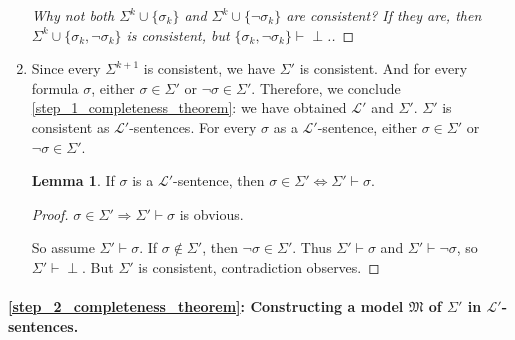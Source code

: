 \documentclass[11pt,letterpaper]{book}
\theoremstyle{definition}
\newtheorem{lemma}{Lemma}[section]
\begin{document}
\begin{enumerate}
\begin{proof}
[Why not both $\Sigma^k \cup \{ \sigma_k \}$ and $\Sigma^k \cup \{ \lnot
\sigma_k \} $ are consistent? If they are, then $\Sigma^k \cup \{
\sigma_k, \lnot \sigma_k \}$ is consistent, but $\{ \sigma_k, \lnot
\sigma_k \} \vdash \perp $.]
\end{proof}

\item{Since every $\Sigma^{k+1}$ is consistent, we have $\Sigma'$ is
consistent. And for every formula $\sigma$, either $\sigma \in \Sigma'$
or $\lnot \sigma  \in \Sigma' $. Therefore, we conclude
\ref{step_1_completeness_theorem}: we have obtained $\mathcal{L}'$ and
$\Sigma'$. $\Sigma'$ is consistent as $\mathcal{L}'$-sentences. For
every  $\sigma$ as a $\mathcal{L}'$-sentence, either $\sigma \in
\Sigma'$ or $ \lnot \sigma \in \Sigma'$.}

\begin{lemma}\label{lemma:sentence_in_Sigma_prime_deducible}
If $\sigma$ is a $\mathcal{L}'$-sentence, then $\sigma \in \Sigma' \iff
\Sigma' \vdash \sigma$.

\end{lemma}

\begin{proof}
$\sigma \in \Sigma' \Rightarrow \Sigma' \vdash \sigma$ is obvious.

So assume $\Sigma' \vdash \sigma$. If $\sigma \not \in \Sigma'$, then
$\lnot \sigma \in \Sigma'$. Thus $\Sigma' \vdash \sigma$ and $\Sigma'
\vdash \lnot \sigma$, so $\Sigma' \vdash \perp$. But $\Sigma'$ is
consistent, contradiction observes.

\end{proof}

\end{enumerate}

\paragraph{\ref{step_2_completeness_theorem}: Constructing a model
$\mathfrak{M}$ of $\Sigma'$ in $\mathcal{L}'$-sentences.}
\end{document}
